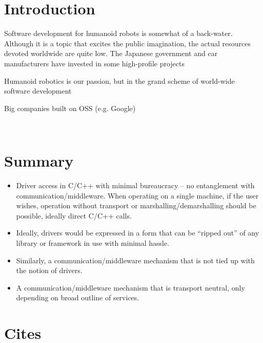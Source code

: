 
\section{Introduction}


Software development for humanoid robots is somewhat of a back-water.
Although it is a topic that excites the public imagination, the
actual resources devoted worldwide are quite low.  The Japanese
government and car manufacturers have invested in some high-profile
projects




Humanoid robotics is our passion, but in the grand scheme
of world-wide software development 




Big companies built on OSS (e.g. Google)


\ \\
\newpage


\section{Summary}

\begin{itemize}

\item Driver access in C/C++ with minimal bureaucracy -- no
entanglement with communication/middleware.  When operating
on a single machine, if the user wishes, operation without
transport or marshalling/demarshalling should be possible, ideally
direct C/C++ calls.

\item Ideally, drivers would be expressed in a form that
can be ``ripped out'' of any library or framework in use
with minimal hassle.

\item Similarly, a communication/middleware mechanism that is 
not tied up with the notion of drivers.

\item A communication/middleware mechanism that is transport
neutral, only depending on broad outline of services.



\end{itemize}


\section{Cites}

\cite{kramer2007development}

